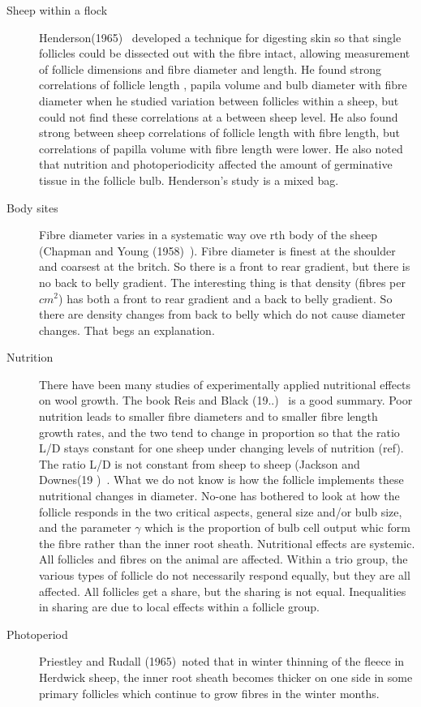 \documentclass[titlepage]{article}  %
\begin{document}
\begin{description}
\item[Sheep within a flock] Henderson(1965)~\cite{hend:65} developed a technique for digesting skin so that single follicles could be dissected out with the fibre intact, allowing measurement of follicle dimensions and fibre diameter and length. He found strong correlations of follicle length , papila volume and bulb diameter with fibre diameter when he studied variation between follicles within a sheep, but could not find these correlations at a between sheep level. He also found strong between sheep correlations of follicle length with fibre length, but correlations of papilla volume with fibre length were lower.  He also noted that nutrition and photoperiodicity affected the amount of germinative tissue in the follicle bulb. Henderson's study is a mixed bag.
\item[Body sites] Fibre diameter varies in a systematic way ove rth body of the sheep (Chapman and Young (1958)~\cite{chap:58}). Fibre diameter is finest at the shoulder and coarsest at the britch. So there is a front to rear gradient, but there is no back to belly gradient. The interesting thing is that density (fibres per $cm^{2}$) has both a front to rear gradient and a back to belly gradient.  So there are density changes from back to belly which do not cause diameter changes.  That begs an explanation.
\item[Nutrition]
There have been many studies of experimentally applied nutritional effects on wool growth. 
The book Reis and Black (19..)~\cite{} is a good summary.
Poor nutrition leads to smaller fibre diameters and to smaller fibre length growth rates, and the two tend to change in proportion so that the ratio L/D stays constant for one sheep under changing levels of nutrition (ref). The ratio L/D is not constant from sheep to sheep (Jackson and Downes(19  )~\cite{jack:}.
What we do not know is how the follicle implements these nutritional changes in diameter. No-one has bothered to look at how the follicle responds in the two critical aspects, general size and/or bulb size, and the parameter $\gamma$ which is the proportion of bulb cell output whic form the fibre rather than the inner root sheath.
Nutritional effects are systemic. All follicles and fibres on the animal are affected. Within a trio group, the various types of follicle do not necessarily respond equally, but they are all affected. All follicles get a share, but the sharing is not equal. Inequalities in sharing are due to local effects within a follicle group.
\item[Photoperiod] Priestley and Rudall (1965)~\cite{prie:65}noted that in winter thinning of the fleece in Herdwick sheep, the inner root sheath becomes thicker on one side in some primary follicles which continue to grow fibres in the winter months.

\end{description}
\end{document}
